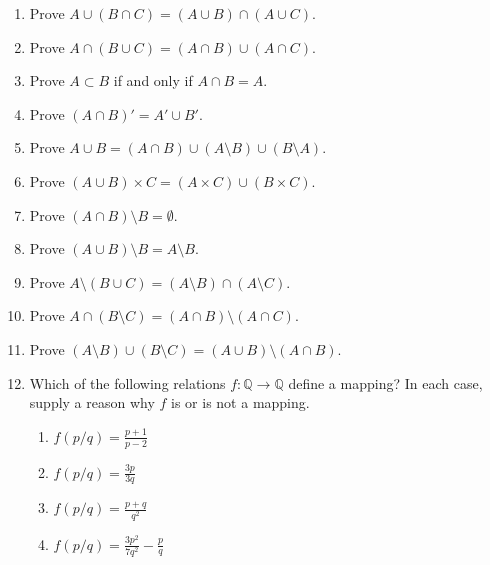 {\begin{enumerate}
\item
Prove $A \cup (B \cap C) = (A \cup B) \cap (A \cup C)$.
 
\item
Prove $A \cap (B \cup C) = (A \cap B) \cup (A \cap C)$.
 
\item
Prove  $A \subset B$ if and only if $A \cap B = A$.
 
\item
Prove $(A \cap B)' = A' \cup B'$.

\item
Prove  $A \cup B = (A \cap B) \cup (A \setminus B) \cup (B \setminus A)$. 
 
\item
Prove  $(A \cup B) \times C = (A \times C ) \cup (B \times C)$.
 
\item
Prove  $(A \cap B) \setminus B = \emptyset$.
 
\item
Prove  $(A \cup B) \setminus B = A \setminus B$.
 
\item
Prove  $A \setminus (B \cup C) = (A \setminus B) \cap (A \setminus C)$. 

\item
Prove  $A \cap (B \setminus C) = (A \cap B) \setminus (A \cap C)$. 
 
\item
Prove  $(A \setminus B) \cup (B \setminus C) = (A \cup B) \setminus (A \cap B)$. 
 
\item
Which of the following relations $f: {\mathbb Q} \rightarrow {\mathbb Q}$
define a mapping? In each case, supply a reason why $f$ is or is not a
mapping. 
\begin{multicols}{2}
\begin{enumerate}

\item 
$\displaystyle f(p/q) = \frac{p+ 1}{p - 2}$

\item 
$\displaystyle f(p/q) = \frac{3p}{3q}$

\item 
$\displaystyle f(p/q) = \frac{p+q}{q^2}$

\item 
$\displaystyle f(p/q) = \frac{3 p^2}{7 q^2} - \frac{p}{q}$

\end{enumerate}
\end{multicols}
 

\end{enumerate}}
